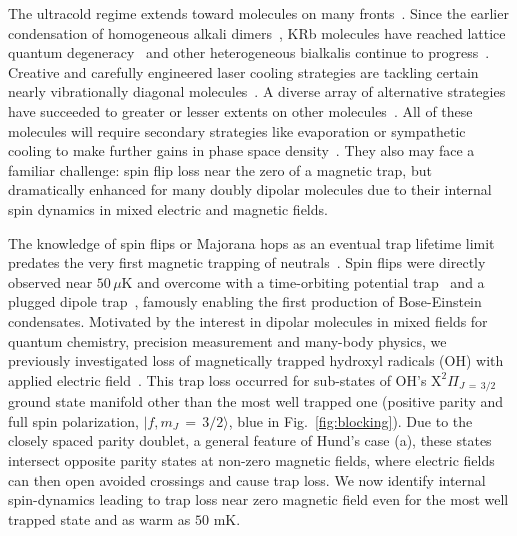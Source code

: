 \documentclass[%
 reprint,
 amsmath,amssymb,
 aps,
prl,
]{revtex4-1}
\begin{document}
The ultracold regime extends toward molecules on many fronts~\cite{Carr2009}. 
Since the earlier condensation of homogeneous alkali dimers~\cite{Greiner2003,Zwierlein2003,Jochim2003}, KRb molecules have reached lattice quantum degeneracy~\cite{Moses2015} and other heterogeneous bialkalis continue to progress~\cite{Takekoshi2014, Park2015,Guo2016,Liu2017,Rvachov2017}. 
Creative and carefully engineered laser cooling strategies are tackling certain nearly vibrationally diagonal molecules~\cite{Stuhl2008,Hummon2013, Barry2014, Zhelyazkova2014, Hemmerling2016, Truppe2017}. 
A diverse array of alternative strategies have succeeded to greater or lesser extents on other molecules~\cite{Doyle1998, Bethlem1999, Bochinski2003, Narevicius2008, Wiederkehr2012, Prehn2016,Liu2017a}. 
All of these molecules will require secondary strategies like evaporation or sympathetic cooling to make further gains in phase space density~\cite{Parazzoli2011, Stuhl2012evap, Quemener2016}. 
They also may face a familiar challenge: spin flip loss near the zero of a magnetic trap, but dramatically enhanced for many doubly dipolar molecules due to their internal spin dynamics in mixed electric and magnetic fields. 

The knowledge of spin flips or Majorana hops as an eventual trap lifetime limit predates the very first magnetic trapping of neutrals~\cite{Migdall1985}. 
Spin flips were directly observed near $50\,\mu\text{K}$ and overcome with a time-orbiting potential trap~\cite{Petrich1995} and a plugged dipole trap~\cite{Davis1995}, famously enabling the first production of Bose-Einstein condensates.
Motivated by the interest in dipolar molecules in mixed fields for quantum chemistry, precision measurement and many-body physics, we previously investigated loss of magnetically trapped hydroxyl radicals (OH) with applied electric field~\cite{Stuhl2012uwave}. 
This trap loss occurred for sub-states of OH's $\mathrm{X}^2\Pi_{J\,{=}\,3/2}$ ground state manifold other than the most well trapped one (positive parity and full spin polarization, $|f,m_J\,{=}\,3/2\rangle$, blue in Fig.~\ref{fig:blocking}). 
Due to the closely spaced parity doublet, a general feature of Hund's case (a), these states intersect opposite parity states at non-zero magnetic fields, where electric fields can then open avoided crossings and cause trap loss.
We now identify internal spin-dynamics leading to trap loss near zero magnetic field even for the most well trapped state and as warm as $50\text{ mK}$.
\end{document}
